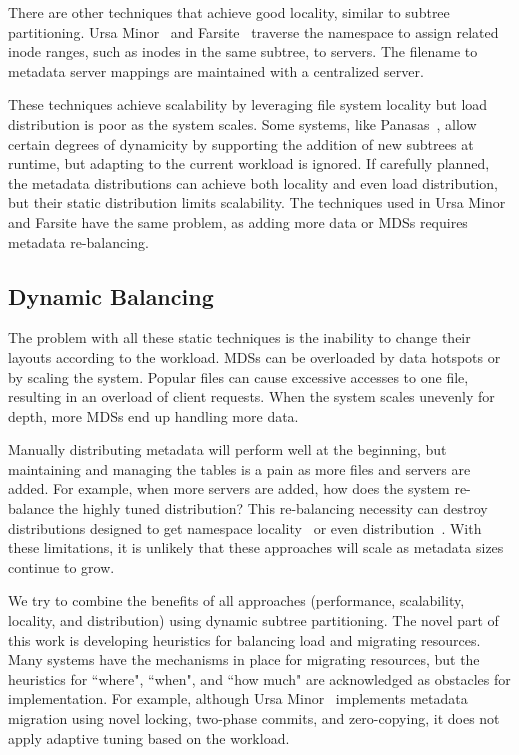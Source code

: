 There are other techniques that achieve good locality, similar to subtree partitioning. Ursa Minor~\cite{sinnamohideen:atc2010-ursa} and Farsite~\cite{doucer:osdi2006-farsite-dir} traverse the namespace to assign related inode ranges, such as inodes in the same subtree, to servers. The filename to metadata server mappings are maintained with a centralized server.

These techniques achieve scalability by leveraging file system locality but load distribution is poor as the system scales. Some systems, like Panasas~\cite{welch:fast2008-panasas}, allow certain degrees of dynamicity by supporting the addition of new subtrees at runtime, but adapting to the current workload is ignored. If carefully planned, the metadata distributions can achieve both locality and even load distribution, but their static distribution limits scalability. The techniques used in Ursa Minor and Farsite have the same problem, as adding more data or MDSs requires metadata re-balancing. 

\subsection{Dynamic Balancing} 
The problem with all these static techniques is the inability to change their layouts according to the workload. MDSs can be overloaded by data hotspots or by scaling the system. Popular files can cause excessive accesses to one file, resulting in an overload of client requests. When the system scales unevenly for depth, more MDSs end up handling more data.

Manually distributing metadata will perform well at the beginning, but maintaining and managing the tables is a pain as more files and servers are added. For example, when more servers are added, how does the system re-balance the highly tuned distribution? This re-balancing necessity can destroy distributions designed to get namespace locality~\cite{sinnamohideen:atc2010-ursa} or even distribution~\cite{zhu:pds2008-hba}. With these limitations, it is unlikely that these approaches will scale as metadata sizes continue to grow. 

We try to combine the benefits of all approaches (performance, scalability, locality, and distribution) using dynamic subtree partitioning. The novel part of this work is developing heuristics for balancing load and migrating resources. Many systems have the mechanisms in place for migrating resources, but the heuristics for ``where", ``when", and ``how much" are acknowledged as obstacles for implementation. For example, although Ursa Minor~\cite{sinnamohideen:atc2010-ursa,weil:sc2004-dyn-metadata} implements metadata migration using novel locking, two-phase commits, and zero-copying, it does not apply adaptive tuning based on the workload.  

